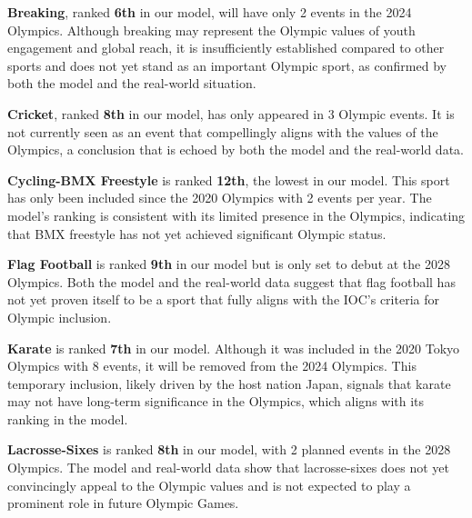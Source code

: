 \documentclass[12pt]{article}
\begin{document}

\textbf{Breaking}, ranked \textbf{6th} in our model, will have only 2 events in the 2024 Olympics. Although breaking may represent the Olympic values of youth engagement and global reach, it is insufficiently established compared to other sports and does not yet stand as an important Olympic sport, as confirmed by both the model and the real-world situation.

\textbf{Cricket}, ranked \textbf{8th} in our model, has only appeared in 3 Olympic events. It is not currently seen as an event that compellingly aligns with the values of the Olympics, a conclusion that is echoed by both the model and the real-world data.

\textbf{Cycling-BMX Freestyle} is ranked \textbf{12th}, the lowest in our model. This sport has only been included since the 2020 Olympics with 2 events per year. The model’s ranking is consistent with its limited presence in the Olympics, indicating that BMX freestyle has not yet achieved significant Olympic status.

\textbf{Flag Football} is ranked \textbf{9th} in our model but is only set to debut at the 2028 Olympics. Both the model and the real-world data suggest that flag football has not yet proven itself to be a sport that fully aligns with the IOC's criteria for Olympic inclusion.

\textbf{Karate} is ranked \textbf{7th} in our model. Although it was included in the 2020 Tokyo Olympics with 8 events, it will be removed from the 2024 Olympics. This temporary inclusion, likely driven by the host nation Japan, signals that karate may not have long-term significance in the Olympics, which aligns with its ranking in the model.

\textbf{Lacrosse-Sixes} is ranked \textbf{8th} in our model, with 2 planned events in the 2028 Olympics. The model and real-world data show that lacrosse-sixes does not yet convincingly appeal to the Olympic values and is not expected to play a prominent role in future Olympic Games.
\end{document}
